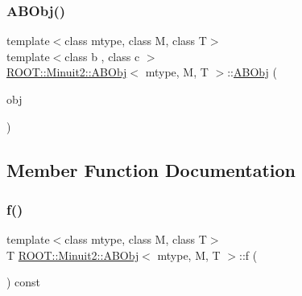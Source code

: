\subsubsection{\texorpdfstring{ABObj()}{ABObj()}\hspace{0.1cm}{\footnotesize\ttfamily [12/12]}}
{\footnotesize\ttfamily template$<$class mtype, class M, class T$>$ \\
template$<$class b , class c $>$ \\
\mbox{\hyperlink{classROOT_1_1Minuit2_1_1ABObj}{R\+O\+O\+T\+::\+Minuit2\+::\+A\+B\+Obj}}$<$ mtype, M, T $>$\+::\mbox{\hyperlink{classROOT_1_1Minuit2_1_1ABObj}{A\+B\+Obj}} (\begin{DoxyParamCaption}\item[{const \mbox{\hyperlink{classROOT_1_1Minuit2_1_1ABObj}{A\+B\+Obj}}$<$ mtype, b, c $>$ \&}]{obj }\end{DoxyParamCaption})\hspace{0.3cm}{\ttfamily [inline]}}



\subsection{Member Function Documentation}
\mbox{\label{classROOT_1_1Minuit2_1_1ABObj_aa640f928a8ec245b70d4ac294e1418e5}} 
\subsubsection{\texorpdfstring{f()}{f()}\hspace{0.1cm}{\footnotesize\ttfamily [1/3]}}
{\footnotesize\ttfamily template$<$class mtype, class M, class T$>$ \\
T \mbox{\hyperlink{classROOT_1_1Minuit2_1_1ABObj}{R\+O\+O\+T\+::\+Minuit2\+::\+A\+B\+Obj}}$<$ mtype, M, T $>$\+::f (\begin{DoxyParamCaption}{ }\end{DoxyParamCaption}) const\hspace{0.3cm}{\ttfamily [inline]}}


